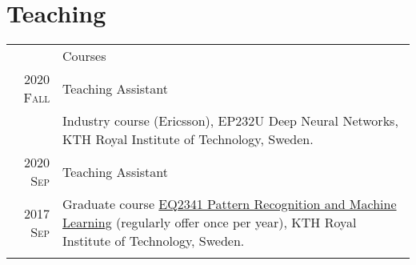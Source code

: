 \documentclass[a4paper,10pt]{article}
\begin{document}
\section{Teaching}
\begin{longtable}{r|p{13cm}}
  & Courses \\
  \cline{2-2}
  \textsc{2020 Fall} & Teaching Assistant \\
  & Industry course (Ericsson), {EP232U Deep Neural Networks}, KTH Royal Institute of Technology, Sweden.\\
  \cline{2-2}
  \textsc{2020 Sep}  & Teaching Assistant \\
  \textsc{2017 Sep}  & Graduate course \href{https://www.kth.se/student/kurser/kurs/EQ2341?l=en}{EQ2341 Pattern Recognition and Machine Learning} (regularly offer once per year), KTH Royal Institute of Technology, Sweden.\\
  \multicolumn{2}{c}{} \\


\end{longtable}
\end{document}
